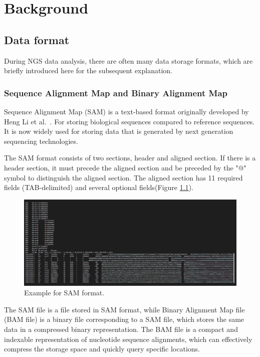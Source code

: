\documentclass[PhD]{PHlab-thesis}
\begin{document}
\chapter{Background}
\section{Data format}
During NGS data analysis, there are often many data storage formats, which are briefly introduced here for the subsequent explanation.
\subsection{Sequence Alignment Map and Binary Alignment Map}
Sequence Alignment Map (SAM) is a text-based format originally developed by Heng Li et al.~\cite{li2009SAMtools}. For storing biological sequences compared to reference sequences. It is now widely used for storing data that is generated by next generation sequencing technologies.

The SAM format consists of two sections, header and aligned section. If there is a header section, it must precede the aligned section and be preceded by the "@" symbol to distinguish the aligned section. The aligned section has 11 required fields (TAB-delimited) and several optional fields(Figure \ref{fig:SAM format}).

\begin{figure}[h!]
	\centering
	\includegraphics[scale=0.3]{figures/Example for SAM file.png}
	\caption{Example for SAM format.}
	\label{fig:SAM format} %
\end{figure}

The SAM file is a file stored in SAM format, while Binary Alignment Map file (BAM file) is a binary file corresponding to a SAM file, which stores the same data in a compressed binary representation. The BAM file is a compact and indexable representation of nucleotide sequence alignments, which can effectively compress the storage space and quickly query specific locations.
\end{document}
